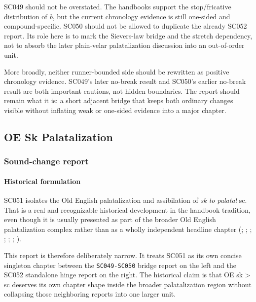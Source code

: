 \documentclass[
  british,
  a4paper,
]{article}
\begin{document}
SC049 should not be overstated. The handbooks support the stop/fricative
distribution of \emph{b}, but the current chronology evidence is still
one-sided and compound-specific. SC050 should not be allowed to
duplicate the already SC052 report. Its role here is to mark the
Sievers-law bridge and the stretch dependency, not to absorb the later
plain-velar palatalization discussion into an out-of-order unit.

More broadly, neither runner-bounded side should be rewritten as
positive chronology evidence. SC049's later no-break result and SC050's
earlier no-break result are both important cautions, not hidden
boundaries. The report should remain what it is: a short adjacent bridge
that keeps both ordinary changes visible without inflating weak or
one-sided evidence into a major chapter.

\subsection{OE Sk Palatalization}\label{oe-sk-palatalization}

\subsubsection{Sound-change report}\label{sound-change-report-31}

\paragraph{Historical formulation}\label{historical-formulation-31}

SC051 isolates the Old English palatalization and assibilation of
\emph{sk to palatal }sc. That is a real and recognizable historical
development in the handbook tradition, even though it is usually
presented as part of the broader Old English palatalization complex
rather than as a wholly independent headline chapter
(;
;
;
;
;
;
).

This report is therefore deliberately narrow. It treats SC051 as its own
concise singleton chapter between the \texttt{SC049-SC050} bridge report
on the left and the SC052 standalone hinge report on the right. The
historical claim is that OE sk \textgreater{} sc deserves its own
chapter shape inside the broader palatalization region without
collapsing those neighboring reports into one larger unit.
\end{document}
